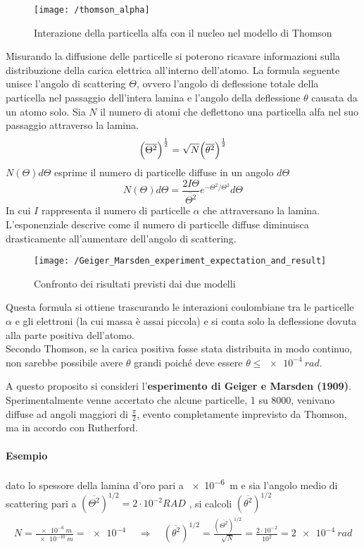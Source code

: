 \begin{figure}[h]
\centering
\texttt{[image: /thomson\_alpha]}
\caption{Interazione della particella alfa con il nucleo nel modello di Thomson}
\end{figure}
Misurando la diffusione delle particelle si poterono ricavare informazioni sulla distribuzione della carica elettrica all'interno dell'atomo.
La formula seguente unisce l'angolo di scattering $\Theta$, ovvero l'angolo di deflessione totale della particella nel passaggio dell'intera lamina e l'angolo della deflessione $\theta$ causata da un atomo solo.
Sia $N$ il numero di atomi che deflettono una particella alfa nel suo passaggio attraverso la lamina.
\begin{equation}
\Bigl(  \overline{ \Theta^2 }  \Bigr)^{ \frac{ 1}{2 } } = \sqrt{N} \Bigl(  \overline{ \theta^2 }  \Bigr)^{ \frac{ 1}{2 } }
\end{equation}
$N(\Theta)d\Theta$ esprime il numero di particelle diffuse in un angolo $d\Theta$
\begin{equation}
N(\Theta)d\Theta = \frac{2 I \Theta}{\overline{\Theta^2}} e^{-{\Theta^2}/{\overline{\Theta^2}}} d\Theta
\end{equation}
In cui $I$ rappresenta il numero di particelle $\alpha$ che attraversano la lamina.
L'esponenziale descrive come il numero di particelle diffuse diminuisca drasticamente all'aumentare dell'angolo di scattering.
\begin{figure}[h]
\centering
\texttt{[image: /Geiger\_Marsden\_experiment\_expectation\_and\_result]}
\caption{Confronto dei risultati previsti dai due modelli}
\end{figure}
Questa formula si ottiene trascurando le interazioni coulombiane tra le particelle $\alpha$ e gli elettroni (la cui massa è assai piccola) e si conta solo la deflessione dovuta alla parte positiva dell'atomo. \\
Secondo Thomson, se la carica positiva fosse stata distribuita in modo continuo, non sarebbe possibile avere $\theta$ grandi poiché deve essere $\theta \le \SI{e-4}{rad}$.

A questo proposito si consideri l'\textbf{esperimento di Geiger e Marsden (1909)}.
Sperimentalmente venne accertato che alcune particelle, 1 su 8000, venivano diffuse ad angoli maggiori di $\frac{ \pi}{2 }$, evento completamente imprevisto da Thomson, ma in accordo con Rutherford.

\paragraph{Esempio} 
dato lo spessore della lamina d'oro pari a \SI{e-6}{m} e sia l'angolo medio di scattering pari a $(\overline{\Theta^2})^{1/2} = 2\cdot 10^{-2} RAD$ , si calcoli $(\overline{\theta^2})^{1/2}$
\begin{equation}
\begin{split}
N = \frac{\SI{e-6}{m}}{\SI{e-10}{m}} = \SI{e-4}{} 
\quad\Rightarrow\quad 
(\overline{\theta^2})^{1/2} = \frac{(\overline{\Theta^2})^{1/2}}{\sqrt{N}} = \frac{2\cdot 10^{-2}}{10^{2}} = \SI{2e-4}{rad}
\end{split}
\end{equation}


